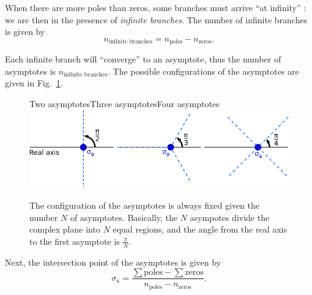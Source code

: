 \documentclass[a4paper,11pt]{report}
\theoremstyle{definition}
\begin{document}
When there are more poles than zeros, some branches must arrive ``at
infinity'' : we are then in the presence of \emph{infinite branches}. The
number of infinite branches is given by
\[
n_\textrm{infinite branches} = n_\textrm{poles} - n_\textrm{zeros}.
\]

Each infinite branch will ``converge'' to an asymptote, thus the
number of asymptotes is $n_\textrm{infinite branches}$. The
possible configurations of the asymptotes are given in
Fig.~\ref{fig:asymptotes}.
\begin{figure}[H]
  \centering
  \hspace{0.5cm}Two asymptotes\hspace{1.5cm}Three asymptotes\hspace{1.5cm}Four asymptotes\\
  \includegraphics[width=12cm]{fig/asymptotes.pdf}
  \caption{The configuration of the asymptotes is always fixed given
    the number $N$ of asymptotes. Basically, the $N$ asympotes divide
    the complex plane into $N$ equal regions, and the angle from the
    real axis to the first asymptote is $\frac{\pi}{N}$.}
  \label{fig:asymptotes}
\end{figure}

Next, the intersection point of the asymptotes is given by
\[
\sigma_a = \frac{\sum \textrm{poles}-\sum \textrm{zeros}}{n_\textrm{poles} -
  n_\textrm{zeros}}.
\]
\end{document}
